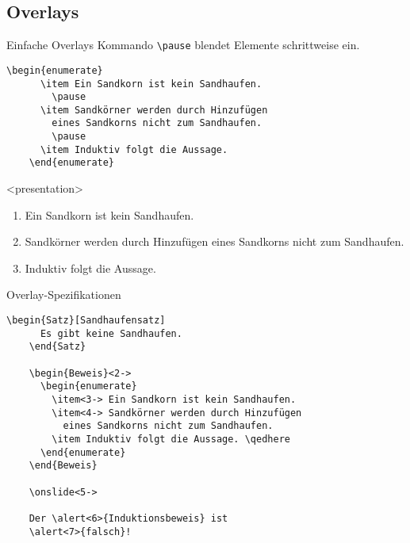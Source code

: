 
\subsection{Overlays}

\begin{Frame}[fragile]{Einfache Overlays}
  Kommando \lstinline-\pause- blendet Elemente schrittweise ein.

  \begin{lstlisting}[gobble=4]
    \begin{enumerate}
      \item Ein Sandkorn ist kein Sandhaufen.
        \pause
      \item Sandkörner werden durch Hinzufügen
        eines Sandkorns nicht zum Sandhaufen.
        \pause
      \item Induktiv folgt die Aussage.
    \end{enumerate}
  \end{lstlisting}

  \xxx

  \begin{onlyenv}<presentation>
    \begin{enumerate}
      \item Ein Sandkorn ist kein Sandhaufen.
        \pause
      \item Sandkörner werden durch Hinzufügen
        eines Sandkorns nicht zum Sandhaufen.
        \pause
      \item Induktiv folgt die Aussage.
    \end{enumerate}
  \end{onlyenv}
\end{Frame}

\begin{Frame}[fragile]{Overlay-Spezifikationen}
  \begin{lstlisting}[gobble=4]
    \begin{Satz}[Sandhaufensatz]
      Es gibt keine Sandhaufen.
    \end{Satz}

    \begin{Beweis}<2->
      \begin{enumerate}
        \item<3-> Ein Sandkorn ist kein Sandhaufen.
        \item<4-> Sandkörner werden durch Hinzufügen
          eines Sandkorns nicht zum Sandhaufen.
        \item Induktiv folgt die Aussage. \qedhere
      \end{enumerate}
    \end{Beweis}

    \onslide<5->

    Der \alert<6>{Induktionsbeweis} ist
    \alert<7>{falsch}!
  \end{lstlisting}
\end{Frame}

